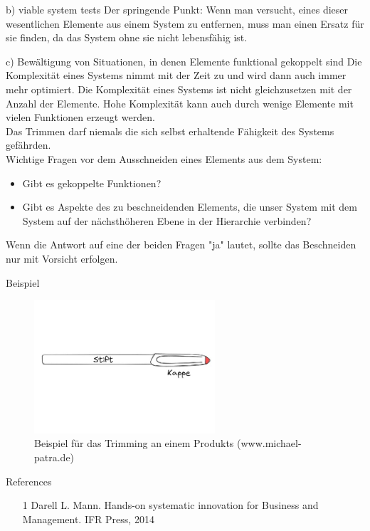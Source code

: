 \documentclass{beamer}
\begin{document}
	
	\begin{frame}{b) viable system tests}
		Der springende Punkt: Wenn man versucht, eines dieser wesentlichen Elemente aus einem System zu entfernen, muss man einen Ersatz für sie finden, da das System ohne sie nicht lebensfähig ist.
	\end{frame}
	
	\begin{frame}{c) Bewältigung von Situationen, in denen Elemente funktional gekoppelt sind}
		Die Komplexität eines Systems nimmt mit der Zeit zu und wird dann auch immer mehr optimiert. Die Komplexität eines Systems ist nicht gleichzusetzen mit der Anzahl der Elemente. Hohe Komplexität kann auch durch wenige Elemente mit vielen Funktionen erzeugt werden.\\
		\vspace{\baselineskip}
		Das Trimmen darf niemals die sich selbst erhaltende Fähigkeit des Systems gefährden.\\
		\vspace{\baselineskip}
		Wichtige Fragen vor dem Ausschneiden eines Elements aus dem System:
		\begin{itemize}
			\item Gibt es gekoppelte Funktionen?
			\item Gibt es Aspekte des zu beschneidenden Elements, die unser System mit dem System auf der nächsthöheren Ebene in der Hierarchie verbinden?
		\end{itemize}
		Wenn die Antwort auf eine der beiden Fragen "ja" lautet, sollte das Beschneiden nur mit Vorsicht erfolgen.
	\end{frame}
	
	
		
	\begin{frame}{Beispiel}
		\begin{figure}
			\centering
			\includegraphics[width=0.6\textwidth]{img/ex.jpg}
			\caption{Beispiel für das Trimming an einem Produkts (www.michael-patra.de)}
		\end{figure}
	\end{frame}
	
	\begin{frame}{References}
		\begin{itemize}
			\item[1] Darell L. Mann. Hands-on systematic innovation for Business and Management. IFR Press, 2014
		\end{itemize}
	\end{frame}
\end{document}
